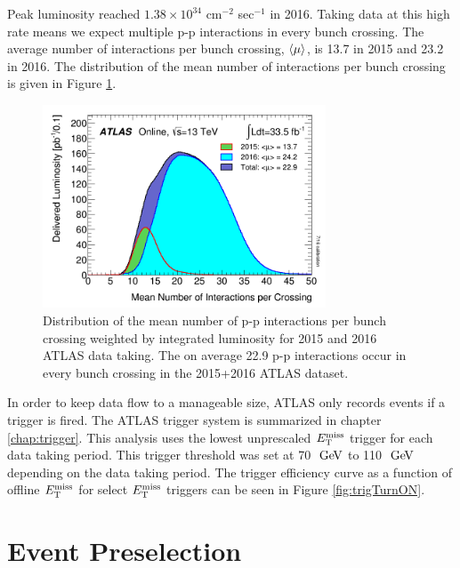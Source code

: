 \indent Peak luminosity reached $1.38 \times 10^{34}$  cm$^{-2}$ sec$^{-1}$ in 2016.  Taking data at this high rate means we expect multiple p-p interactions in every bunch crossing.  The average number of interactions per bunch crossing, $\braket{\mu}$, is 13.7 in 2015 and 23.2 in 2016.  The distribution of the mean number of interactions per bunch crossing is given in Figure \ref{fig:nVtx}.   \\

\begin{figure}[h!]
  \begin{center}
    \includegraphics[width=0.75\textwidth]{figures/Data/mu_2015_2016_LHCC.png}
\end{center}
\caption[Distribution of the mean number of interactions per bunch crossing weighted by integrated luminosity for 2015 and 2016 ATLAS data taking. ]{ Distribution of the mean number of p-p interactions per bunch crossing weighted by integrated luminosity for 2015 and 2016 ATLAS data taking.  The on average 22.9 p-p interactions occur in every bunch crossing in the 2015+2016 ATLAS dataset. }
\label{fig:nVtx} 
\end{figure}

\indent In order to keep data flow to a manageable size, ATLAS only records events if a trigger is fired.  The ATLAS trigger system is summarized in chapter \ref{chap:trigger}.  This analysis uses the lowest unprescaled $E_{\mathrm{T}}^{\mathrm{miss}}$ trigger for each data taking period.  This trigger threshold was set at 70 $\gev$ to 110 $\gev$ depending on the data taking period. The trigger efficiency curve as a function of offline $E_{\mathrm{T}}^{\mathrm{miss}}$ for select $E_{\mathrm{T}}^{\mathrm{miss}}$ triggers can be seen in Figure \ref{fig:trigTurnON}. \\

\chapter{Event Preselection}
\label{chap:Selection_EventPreselection}

